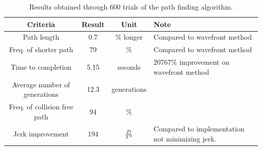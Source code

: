 \begin{table}
\renewcommand{\arraystretch}{1.3}
\caption{Results obtained through 600 trials of the path finding algorithm.}
\label{table_example}
\begin{center}
		\begin{tabular}{ c | c  c  p{2cm} }
		Criteria & Result & Unit & Note \\ \hline
		Path length & 0.7 & \% longer & Compared to wavefront method \\ 
		Freq. of shorter path & 79 & \% & Compared to wavefront method \\ 
		Time to completion & 5.15 & seconds & 20767\% improvement on wavefront method \\ 
		Average number of generations & 12.3 & generations & \\ 
		Freq. of collision free path & 94 & \% &  \\ 
		Jerk improvement & 194 & ${{D}\over{T^3}}$ & Compared to implementation not minimizing jerk.\\ 
\end{tabular}
\end{center}
\end{table}


